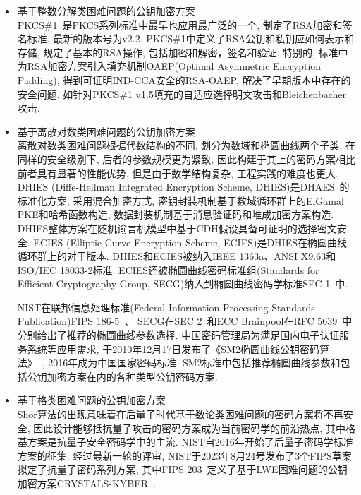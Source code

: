 \begin{itemize}
\item 基于整数分解类困难问题的公钥加密方案\\
    PKCS\#1~\cite{PKCS1}是PKCS系列标准中最早也应用最广泛的一个, 制定了RSA加密和签名标准, 最新的版本号为v2.2. 
    PKCS\#1中定义了RSA公钥和私钥应如何表示和存储, 规定了基本的RSA操作, 包括加密和解密，签名和验证. 
    特别的, 标准中为RSA加密方案引入填充机制OAEP(Optimal Asymmetric Encryption Padding), 得到可证明IND-CCA安全的RSA-OAEP,  
    解决了早期版本中存在的安全问题, 如针对PKCS\#1 v1.5填充的自适应选择明文攻击和Bleichenbacher攻击. 

\item 基于离散对数类困难问题的公钥加密方案\\
    离散对数类困难问题根据代数结构的不同, 划分为数域和椭圆曲线两个子类, 在同样的安全级别下, 
    后者的参数规模更为紧致, 因此构建于其上的密码方案相比前者具有显著的性能优势, 但是由于数学结构复杂, 工程实践的难度也更大. 
    DHIES (Diffe-Hellman Integrated Encryption Scheme, DHIES)是DHAES~\cite{ABR-ePrint-1999}的标准化方案, 
    采用混合加密方式, 密钥封装机制基于数域循环群上的ElGamal PKE和哈希函数构造, 数据封装机制基于消息验证码和堆成加密方案构造. 
    DHIES整体方案在随机谕言机模型中基于CDH假设具备可证明的选择密文安全.
    ECIES (Elliptic Curve Encryption Scheme, ECIES)是DHIES在椭圆曲线循环群上的对于版本. 
    DHIES和ECIES被纳入IEEE 1363a、ANSI X9.63和ISO/IEC 18033-2标准. 
    ECIES还被椭圆曲线密码标准组(Standards for Efficient Cryptography Group, SECG)纳入到椭圆曲线密码学标准SEC 1~\cite{SEC-1}中.
    
    NIST在联邦信息处理标准(Federal Information Processing Standards Publication)FIPS 186-5~\cite{FIPS-186-5}、
    SECG在SEC 2~\cite{SEC-2}和ECC Brainpool在RFC 5639~\cite{RFC-5639}中分别给出了推荐的椭圆曲线参数选择. 
    中国密码管理局为满足国内电子认证服务系统等应用需求, 于2010年12月17日发布了《SM2椭圆曲线公钥密码算法》~\cite{SM2}, 2016年成为中国国家密码标准. SM2标准中包括推荐椭圆曲线参数和包括公钥加密方案在内的各种类型公钥密码方案. 

\item 基于格类困难问题的公钥加密方案\\
    Shor算法的出现意味着在后量子时代基于数论类困难问题的密码方案将不再安全, 因此设计能够抵抗量子攻击的密码方案成为当前密码学的前沿热点, 
    其中格基方案是抗量子安全密码学中的主流. 
    NIST自2016年开始了后量子密码学标准方案的征集. 经过最新一轮的评审, NIST于2023年8月24号发布了3个FIPS草案拟定了抗量子密码系列方案, 
    其中FIPS 203~\cite{FIPS-203}定义了基于LWE困难问题的公钥加密方案CRYSTALS-KYBER~\cite{Kyber-EUROSP-2018}. 
\end{itemize}

